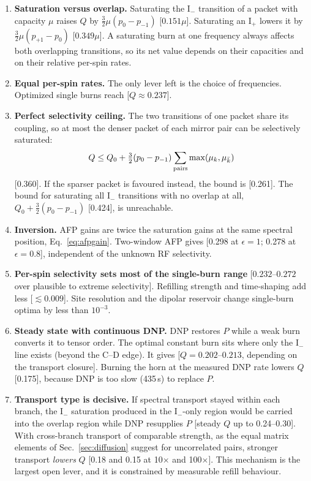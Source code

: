 \documentclass[11pt]{article}
\begin{document}
\begin{enumerate}
\item \textbf{Saturation versus overlap.} Saturating the I$_-$ transition of a packet with
capacity $\mu$ raises $Q$ by $\tfrac32\mu(p_0-p_{-1})$ [$0.151\mu$]. Saturating an I$_+$
lowers it by $\tfrac32\mu(p_{+1}-p_0)$ [$0.349\mu$]. A saturating burn at one frequency always
affects both overlapping transitions, so its net value depends on their capacities and on
their relative per-spin rates.

\item \textbf{Equal per-spin rates.} The only lever left is the choice of frequencies.
Optimized single burns reach [$Q\approx0.237$].

\item \textbf{Perfect selectivity ceiling.} The two transitions of one packet share its
coupling, so at most the denser packet of each mirror pair can be selectively saturated:
\[
Q\le Q_0+\tfrac32(p_0-p_{-1})\sum_{\rm pairs}\max(\mu_k,\mu_{\bar k})
\]
[0.360]. If the sparser packet is favoured instead, the bound is [0.261]. The bound for
saturating all I$_-$ transitions with no overlap at all, $Q_0+\tfrac32(p_0-p_{-1})$ [0.424],
is unreachable.

\item \textbf{Inversion.} AFP gains are twice the saturation gains at the same spectral
position, Eq.~\eqref{eq:afpgain}. Two-window AFP gives [0.298 at $\epsilon=1$; 0.278 at
$\epsilon=0.8$], independent of the unknown RF selectivity.

\item \textbf{Per-spin selectivity sets most of the single-burn range}
[$0.232$--$0.272$ over plausible to extreme selectivity]. Refilling strength and time-shaping
add less [$\lesssim0.009$]. Site resolution and the dipolar reservoir change single-burn optima
by less than $10^{-3}$.

\item \textbf{Steady state with continuous DNP.} DNP restores $P$ while a weak burn converts
it to tensor order. The optimal constant burn sits where only the I$_-$ line exists (beyond the
C--D edge). It gives [$Q=0.202$--$0.213$, depending on the transport closure]. Burning the horn
at the measured DNP rate lowers $Q$ [0.175], because DNP is too slow (435\,s) to replace $P$.

\item \textbf{Transport type is decisive.} If spectral transport stayed within each branch,
the I$_-$ saturation produced in the I$_-$-only region would be carried into the overlap
region while DNP resupplies $P$ [steady $Q$ up to 0.24--0.30]. With cross-branch transport
of comparable strength, as the equal matrix elements of Sec.~\ref{sec:diffusion} suggest for
uncorrelated pairs, stronger transport \emph{lowers} $Q$ [0.18 and 0.15 at 10$\times$ and
100$\times$]. This mechanism is the largest open lever, and it is constrained by measurable
refill behaviour.


\end{enumerate}
\end{document}
